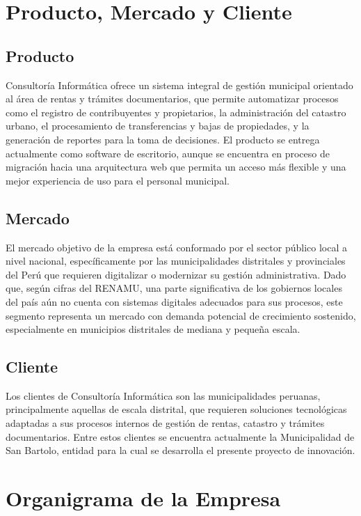 \documentclass[12pt,a4paper]{report}
\begin{document}
\section{Producto, Mercado y Cliente}

\subsection{Producto}

Consultoría Informática ofrece un sistema integral de gestión municipal orientado al área de rentas y trámites documentarios, que permite automatizar procesos como el registro de contribuyentes y propietarios, la administración del catastro urbano, el procesamiento de transferencias y bajas de propiedades, y la generación de reportes para la toma de decisiones. El producto se entrega actualmente como software de escritorio, aunque se encuentra en proceso de migración hacia una arquitectura web que permita un acceso más flexible y una mejor experiencia de uso para el personal municipal.

\subsection{Mercado}

El mercado objetivo de la empresa está conformado por el sector público local a nivel nacional, específicamente por las municipalidades distritales y provinciales del Perú que requieren digitalizar o modernizar su gestión administrativa. Dado que, según cifras del RENAMU, una parte significativa de los gobiernos locales del país aún no cuenta con sistemas digitales adecuados para sus procesos, este segmento representa un mercado con demanda potencial de crecimiento sostenido, especialmente en municipios distritales de mediana y pequeña escala.

\subsection{Cliente}

Los clientes de Consultoría Informática son las municipalidades peruanas, principalmente aquellas de escala distrital, que requieren soluciones tecnológicas adaptadas a sus procesos internos de gestión de rentas, catastro y trámites documentarios. Entre estos clientes se encuentra actualmente la Municipalidad de San Bartolo, entidad para la cual se desarrolla el presente proyecto de innovación.

\section{Organigrama de la Empresa}
\end{document}
